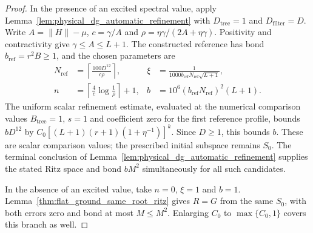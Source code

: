 \begin{proof}\leanok
    In the presence of an excited spectral value, apply
    Lemma~\ref{lem:physical_dg_automatic_refinement} with
    $D_{\mathrm{tree}}=1$ and $D_{\mathrm{filter}}=D$. Write
    $A=\|H\|-\mu$, $c=\gamma/A$ and
    $\rho=\eta\gamma/(2A+\eta\gamma)$. Positivity and contractivity give
    $\gamma\le A\le L+1$. The constructed reference has bond
    $b_{\mathrm{ref}}=r^2B\ge1$, and the chosen parameters are
    \begin{align}
        N_{\mathrm{ref}} & =\left\lceil\frac{100D^{12}}{c\rho}\right\rceil,           &
        \xi              & =\frac{1}{1000b_{\mathrm{ref}}N_{\mathrm{ref}}\sqrt{L+1}},   \\
        n                & =\left\lceil\frac4c\log\frac1\rho\right\rceil+1,           &
        b                & =10^6(b_{\mathrm{ref}}N_{\mathrm{ref}})^2(L+1).
    \end{align}
    The uniform scalar refinement estimate, evaluated at the numerical
    comparison values $B_{\mathrm{tree}}=1$, $s=1$ and coefficient zero
    for the first reference profile, bounds $bD^{12}$ by
    $C_0[(L+1)(r+1)(1+\eta^{-1})]^k$. Since $D\ge1$, this bounds $b$.
    These are scalar comparison values; the prescribed initial subspace
    remains $S_0$. The terminal conclusion of
    Lemma~\ref{lem:physical_dg_automatic_refinement} supplies the stated
    Ritz space and bond $bM^2$ simultaneously for all such candidates.

    In the absence of an excited value, take $n=0$, $\xi=1$ and $b=1$.
    Lemma~\ref{thm:flat_ground_same_root_ritz} gives $R=G$ from the same
    $S_0$, with both errors zero and bond at most $M\le M^2$.
    Enlarging $C_0$ to $\max\{C_0,1\}$ covers this branch as well.
\end{proof}
